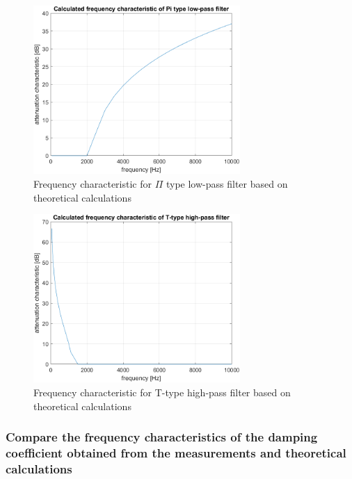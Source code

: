 \documentclass[]{scrartcl}
\begin{document}
\begin{figure}[H]
	\centering
	\includegraphics[width=0.7\textwidth]{Pictures/cal_low.png}
	\caption{Frequency characteristic for $\Pi$ type low-pass filter based on theoretical calculations}
	\label{fig:low-cal char}
\end{figure}


\begin{figure}[H]
	\centering
	\includegraphics[width=0.7\textwidth]{Pictures/cal_high.png}
	\caption{Frequency characteristic for T-type high-pass filter based on theoretical calculations}
	\label{fig:high-cal char}
\end{figure}

\subsubsection{Compare the frequency characteristics of the damping coefficient obtained from the measurements and theoretical calculations}
\end{document}
